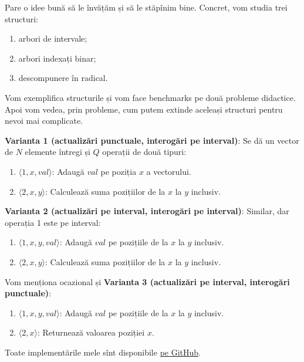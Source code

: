 Pare o idee bună să le învățăm și să le stăpînim bine.  Concret, vom studia trei structuri:

\begin{enumerate}
  \item arbori de intervale;
  \item arbori indexați binar;
  \item descompunere în radical.
\end{enumerate}

Vom exemplifica structurile și vom face benchmarks pe două probleme didactice. Apoi vom vedea, prin probleme, cum putem extinde aceleași structuri pentru nevoi mai complicate.

\textbf{Varianta 1 (actualizări punctuale, interogări pe interval)}: Se dă un vector de $N$ elemente întregi și $Q$ operații de două tipuri:

\begin{enumerate}
  \item $\langle 1, x, val \rangle$: Adaugă $val$ pe poziția $x$ a vectorului.
  \item $\langle 2, x, y \rangle$: Calculează suma pozițiilor de la $x$ la $y$ inclusiv.
\end{enumerate}

\textbf{Varianta 2 (actualizări pe interval, interogări pe interval)}: Similar, dar operația 1 este pe interval:

\begin{enumerate}
  \item $\langle 1, x, y, val \rangle$: Adaugă $val$ pe pozițiile de la $x$ la $y$ inclusiv.
  \item $\langle 2, x, y \rangle$: Calculează suma pozițiilor de la $x$ la $y$ inclusiv.
\end{enumerate}

Vom menționa ocazional și \textbf{Varianta 3 (actualizări pe interval, interogări punctuale)}:

\begin{enumerate}
  \item $\langle 1, x, y, val \rangle$: Adaugă $val$ pe pozițiile de la $x$ la $y$ inclusiv.
  \item $\langle 2, x \rangle$: Returnează valoarea poziției $x$.
\end{enumerate}

Toate implementările mele sînt disponibile \href{https://github.com/CatalinFrancu/nerdvana/tree/main/query-update}{pe GitHub}.

